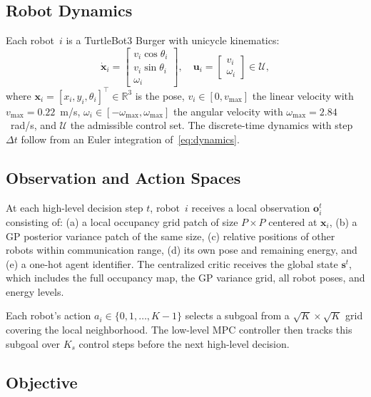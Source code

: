 \documentclass[letterpaper]{IEEEtran}
\newcommand{\xbf}{\mathbf{x}}
\newcommand{\ubf}{\mathbf{u}}
\newcommand{\sbf}{\mathbf{s}}
\newcommand{\obf}{\mathbf{o}}
\newcommand{\Rbb}{\mathbb{R}}
\begin{document}
\subsection{Robot Dynamics}

Each robot~$i$ is a TurtleBot3 Burger with unicycle kinematics:
\begin{equation}
\dot{\xbf}_i = \begin{bmatrix} v_i \cos\theta_i \\ v_i \sin\theta_i \\ \omega_i \end{bmatrix}, \quad
\ubf_i = \begin{bmatrix} v_i \\ \omega_i \end{bmatrix} \in \mathcal{U},
\label{eq:dynamics}
\end{equation}
where $\xbf_i = [x_i, y_i, \theta_i]^\top \in \Rbb^3$ is the pose, $v_i \in [0, v_{\max}]$ the linear velocity with $v_{\max} = 0.22$~m/s, $\omega_i \in [-\omega_{\max}, \omega_{\max}]$ the angular velocity with $\omega_{\max} = 2.84$~rad/s, and $\mathcal{U}$ the admissible control set. The discrete-time dynamics with step $\Delta t$ follow from an Euler integration of~\eqref{eq:dynamics}.

\subsection{Observation and Action Spaces}

At each high-level decision step $t$, robot~$i$ receives a local observation $\obf_i^t$ consisting of: (a) a local occupancy grid patch of size $P \times P$ centered at $\xbf_i$, (b) a GP posterior variance patch of the same size, (c) relative positions of other robots within communication range, (d) its own pose and remaining energy, and (e) a one-hot agent identifier. The centralized critic receives the global state $\sbf^t$, which includes the full occupancy map, the GP variance grid, all robot poses, and energy levels.

Each robot's action $a_i \in \{0, 1, \dots, K{-}1\}$ selects a subgoal from a $\sqrt{K} \times \sqrt{K}$ grid covering the local neighborhood. The low-level MPC controller then tracks this subgoal over $K_s$ control steps before the next high-level decision.

\subsection{Objective}
\end{document}
